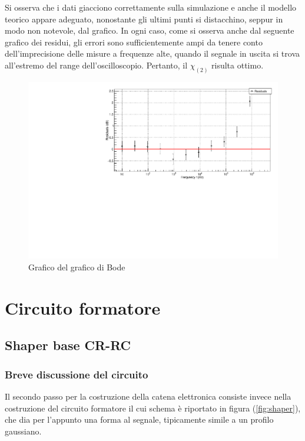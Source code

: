 \documentclass{article}
\begin{document}
Si osserva che i dati giacciono correttamente sulla simulazione e anche il modello teorico appare adeguato, nonostante gli ultimi punti si distacchino, seppur in modo
non notevole, dal grafico. In ogni caso, come si osserva anche dal seguente grafico dei residui, gli errori sono sufficientemente ampi da tenere conto dell'imprecisione
delle misure a frequenze alte, quando il segnale in uscita si trova all'estremo del range dell'oscilloscopio. Pertanto, il $\chi_{(2)}$ risulta ottimo.

\begin{center}
    \begin{figure}[H]
    \centering
    \includegraphics[scale=0.4, angle=0]{bodepreampresidui.pdf}
    \caption{Grafico del grafico di Bode}
    \label{fig:bodepreamp_res}
    \end{figure}
\end{center}

\section{Circuito formatore}
\subsection{Shaper base CR-RC}
\subsubsection{Breve discussione del circuito}

Il secondo passo per la costruzione della catena elettronica consiste invece nella costruzione del circuito formatore il cui schema è 
riportato in figura (\ref{fig:shaper}), che dia per l'appunto una forma al segnale, tipicamente simile a un profilo gaussiano.
\end{document}
